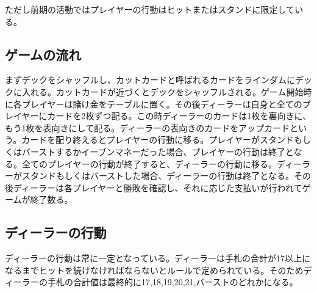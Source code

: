 ただし前期の活動ではプレイヤーの行動はヒットまたはスタンドに限定している。

\subsection{ゲームの流れ}
まずデックをシャッフルし、カットカードと呼ばれるカードをラインダムにデックに入れる。カットカードが近づくとデックをシャッフルされる。ゲーム開始時に各プレイヤーは賭け金をテーブルに置く。その後ディーラーは自身と全てのプレイヤーにカードを2枚ずつ配る。この時ディーラーのカードは1枚を裏向きに、もう1枚を表向きにして配る。ディーラーの表向きのカードをアップカードという。カードを配り終えるとプレイヤーの行動に移る。プレイヤーがスタンドもしくはバーストするかイーブンマネーだった場合、プレイヤーの行動は終了となる。全てのプレイヤーの行動が終了すると、ディーラーの行動に移る。ディーラーがスタンドもしくはバーストした場合、ディーラーの行動は終了となる。その後ディーラーは各プレイヤーと勝敗を確認し、それに応じた支払いが行われてゲームが終了数る。

\subsection{ディーラーの行動}
ディーラーの行動は常に一定となっている。ディーラーは手札の合計が17以上になるまでヒットを続けなければならないとルールで定められている。そのためディーラーの手札の合計値は最終的に17,18,19,20,21,バーストのどれかになる。

